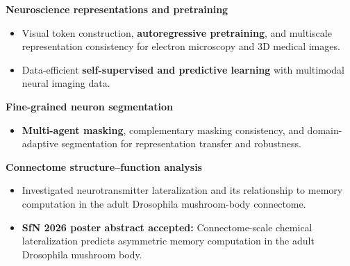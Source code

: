 \documentclass{resume}
\begin{document}
\begin{enumerate}[label=\textbf{[\arabic*]}, leftmargin=2em, itemsep=3pt]
    \item \textbf{Neuroscience representations and pretraining}
    \begin{itemize}
        \item Visual token construction, \textbf{autoregressive pretraining}, and multiscale representation consistency for electron microscopy and 3D medical images.
        \item Data-efficient \textbf{self-supervised and predictive learning} with multimodal neural imaging data.
    \end{itemize}
    \item \textbf{Fine-grained neuron segmentation}
    \begin{itemize}
        \item \textbf{Multi-agent masking}, complementary masking consistency, and domain-adaptive segmentation for representation transfer and robustness.
    \end{itemize}
    \item \textbf{Connectome structure--function analysis}
    \begin{itemize}
        \item Investigated neurotransmitter lateralization and its relationship to memory computation in the adult Drosophila mushroom-body connectome.
        \item \textbf{SfN 2026 poster abstract accepted:} Connectome-scale chemical lateralization predicts asymmetric memory computation in the adult Drosophila mushroom body.
    \end{itemize}
\end{enumerate}
\end{document}
